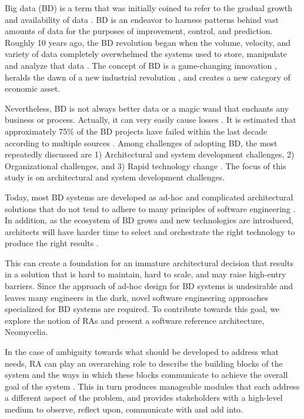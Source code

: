 \documentclass[runningheads]{llncs}
\begin{document}
Big data (BD) is a term that was initially coined to refer to the gradual growth and availability of data \cite{lycett2013datafication}. BD is an endeavor to harness patterns behind vast amounts of data for the purposes of improvement, control, and prediction. Roughly 10 years ago, the BD revolution began when the volume, velocity, and variety of data completely overwhelmed the systems used to store, manipulate and analyze that data \cite{heudecker2014survey,AtaeiBigDataEnvirons}. The concept of BD is a game-changing innovation \cite{chen2017big}, heralds the dawn of a new industrial revolution \cite{Huberty}, and creates a new category of economic asset.

Nevertheless, BD is not always better data or a magic wand that enchants any business or process. Actually, it can very easily cause losses \cite{Ranjan}. It is estimated that approximately 75\% of the BD projects have failed within the last decade according to multiple sources \cite{Partners,analytics2016age,Nash,heudecker2014survey}. Among challenges of adopting BD, the most repeatedly discussed are 1) Architectural and system development challenges, 2) Organizational challenges, and 3) Rapid technology change \cite{chen2017big,AtaeiHype,Singh}. The focus of this study is on architectural and system development challenges.

Today, most BD systems are developed as ad-hoc and complicated architectural solutions that do not tend to adhere to many principles of software engineering \cite{Gorton,Nadal}. In addition, as the ecosystem of BD grows and new technologies are introduced, architects will have harder time to select and orchestrate the right technology to produce the right results \cite{Nadal}.

This can create a foundation for an immature architectural decision that results in a solution that is hard to maintain, hard to scale, and may raise high-entry barriers.  Since the approach of ad-hoc design for BD systems is undesirable and leaves many engineers in the dark, novel software engineering approaches specialized for BD systems are required. To contribute towards this goal, we explore the notion of RAs and present a software reference architecture, Neomycelia.

In the case of ambiguity towards what should be developed to address what needs, RA can play an overarching role to describe the building blocks of the system and the ways in which these blocks communicate to achieve the overall goal of the system \cite{Sievi-Korte}. This in turn produces manageable modules that each address a different aspect of the problem, and provides stakeholders with a high-level medium to observe, reflect upon, communicate with and add into.
\end{document}
